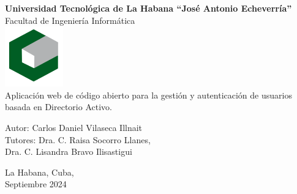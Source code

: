 
\begin{titlepage}
    \centering
    {\fontsize{26pt}{30pt}\selectfont\bfseries Universidad Tecnológica de La Habana “José Antonio Echeverría”}\\
    \vspace{1cm}
    {\fontsize{15pt}{18pt}\selectfont Facultad de Ingeniería Informática}\\
    \vspace{1cm}
    \includegraphics{images/cujae.png}\\
    \vspace{1cm}
    {\fontsize{12pt}{14pt}\selectfont Aplicación web de código abierto para la gestión y autenticación de usuarios basada en Directorio Activo.}\\
    \vspace{2cm}
    \begin{flushleft}
        Autor: Carlos Daniel Vilaseca Illnait\\
        Tutores: Dra. C. Raisa Socorro Llanes,\\ 
        \hspace*{1.85cm}Dra. C. Lisandra Bravo Ilisastigui
    \end{flushleft}
    \vfill
    La Habana, Cuba,\\ Septiembre 2024
\end{titlepage}
